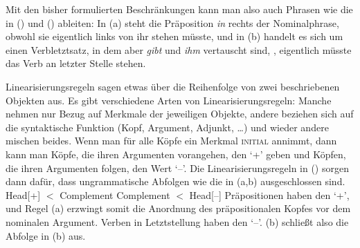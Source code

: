 Mit den bisher formulierten Beschränkungen kann man also auch Phrasen wie die in () und () ableiten:
\eal
{}
\zl
In (a) steht die Präposition \emph{in} rechts der Nominalphrase, obwohl sie eigentlich links von
ihr stehen müsste, und in (b) handelt es sich um einen Verbletztsatz, in dem aber \emph{gibt} und \emph{ihm}
vertauscht sind, \dash, eigentlich müsste das Verb an letzter Stelle stehen. 

Linearisierungsregeln sagen etwas über die Reihenfolge von zwei beschriebenen Objekten aus.
Es gibt verschiedene Arten von Linearisierungsregeln: Manche nehmen nur Bezug auf Merkmale der jeweiligen
Objekte, andere beziehen sich auf die syntaktische Funktion (Kopf, Argument, Adjunkt, \ldots) und
wieder andere mischen beides.
Wenn man für alle Köpfe ein Merkmal \textsc{initial} annimmt, dann kann man Köpfe,
die ihren Argumenten vorangehen, den \initialw `+' geben und Köpfen, die ihren Argumenten folgen,
den Wert `--'. Die Linearisierungsregeln in () sorgen dann dafür, dass ungrammatische
Abfolgen wie die in (a,b) ausgeschlossen sind.
\eal
\ex\label{lp-ini-Komplement} Head[\initial+] $<$ Complement
\ex Complement $<$ Head[\initial --]
\zl
Präpositionen haben den \initialw `+', und Regel (a) erzwingt somit die Anordnung des präpositionalen
Kopfes vor dem nominalen Argument. Verben in Letztstellung haben den \initialw `--'. (b) schließt
also die Abfolge in (b) aus.

